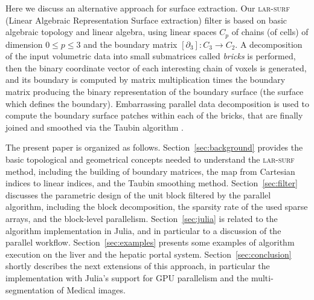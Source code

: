 Here we discuss an alternative approach for surface extraction. Our \textsc{lar-surf} (Linear Algebraic Representation Surface extraction) filter is based on basic algebraic topology and linear algebra, using linear spaces $C_p$ of chains (of cells) of dimension $0 \leq p \leq 3$ and the boundary matrix $[\partial_3] : C_3 \to C_2$.
A decomposition of the input volumetric data into small submatrices called \emph{bricks} is performed, then the binary coordinate vector of each interesting chain of voxels is generated, and its boundary is computed by matrix multiplication times the boundary matrix producing the binary representation of the boundary surface (the surface which defines the boundary). 
Embarrassing parallel data decomposition is used to compute the boundary surface patches within each of the bricks, that are finally joined and smoothed via the Taubin algorithm \cite{Taubin1995}.

The present paper is organized as follows.
Section~\ref{sec:background} provides the basic topological and geometrical concepts needed to understand the \textsc{lar-surf} method, including the building of boundary matrices, the map from Cartesian indices to linear indices, and the Taubin smoothing method.
Section~\ref{sec:filter} discusses the parametric design of the unit block filtered by the parallel algorithm, including the block decomposition, the sparsity rate of the used sparse arrays, and the block-level parallelism.
Section~\ref{sec:julia} is related to the algorithm implementation in Julia, and in particular to a discussion of the parallel workflow.
Section~\ref{sec:examples} presents some examples of algorithm execution on the liver and the hepatic portal system.
Section~\ref{sec:conclusion} shortly describes the next extensions of this approach, in particular the implementation with Julia's support for GPU parallelism and the multi-segmentation of Medical images.
